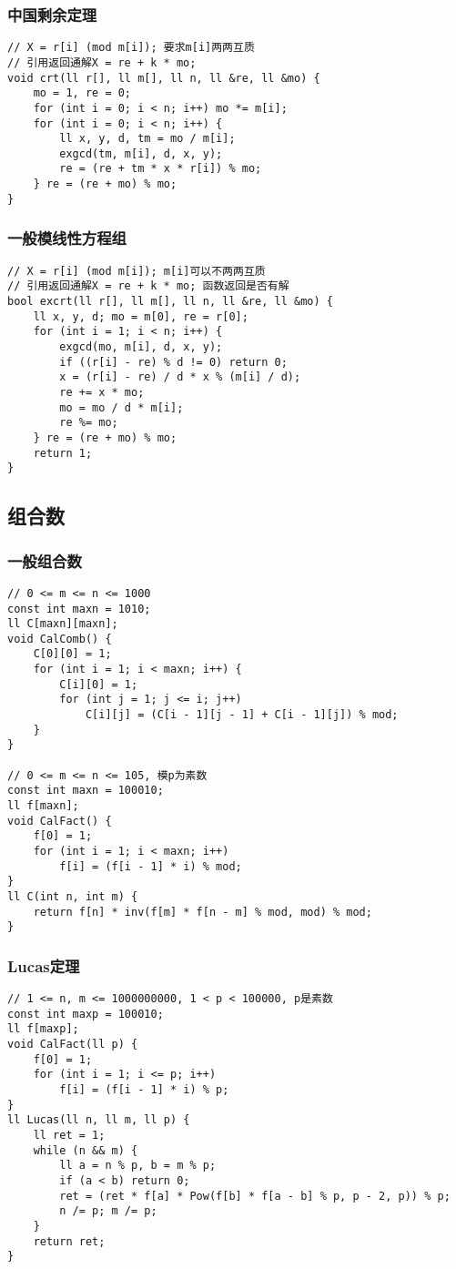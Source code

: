 \documentclass[a4paper]{article}
\begin{document}
\subsubsection{中国剩余定理}
\begin{lstlisting}
// X = r[i] (mod m[i]); 要求m[i]两两互质
// 引用返回通解X = re + k * mo;
void crt(ll r[], ll m[], ll n, ll &re, ll &mo) {
	mo = 1, re = 0;
	for (int i = 0; i < n; i++) mo *= m[i];
	for (int i = 0; i < n; i++) {
		ll x, y, d, tm = mo / m[i];
		exgcd(tm, m[i], d, x, y);
		re = (re + tm * x * r[i]) % mo;
	} re = (re + mo) % mo;
}
\end{lstlisting}
\subsubsection{一般模线性方程组}
\begin{lstlisting}
// X = r[i] (mod m[i]); m[i]可以不两两互质
// 引用返回通解X = re + k * mo; 函数返回是否有解
bool excrt(ll r[], ll m[], ll n, ll &re, ll &mo) {
	ll x, y, d; mo = m[0], re = r[0];
	for (int i = 1; i < n; i++) {
		exgcd(mo, m[i], d, x, y);
		if ((r[i] - re) % d != 0) return 0;
		x = (r[i] - re) / d * x % (m[i] / d);
		re += x * mo;
		mo = mo / d * m[i];
		re %= mo;
	} re = (re + mo) % mo;
	return 1;
}
\end{lstlisting}
\subsection{组合数}
\subsubsection{一般组合数}
\begin{lstlisting}
// 0 <= m <= n <= 1000
const int maxn = 1010;
ll C[maxn][maxn];
void CalComb() {
	C[0][0] = 1;
	for (int i = 1; i < maxn; i++) {
		C[i][0] = 1;
		for (int j = 1; j <= i; j++)
			C[i][j] = (C[i - 1][j - 1] + C[i - 1][j]) % mod;
	}
}

// 0 <= m <= n <= 105, 模p为素数
const int maxn = 100010;
ll f[maxn];
void CalFact() {
	f[0] = 1;
	for (int i = 1; i < maxn; i++)
		f[i] = (f[i - 1] * i) % mod;
}
ll C(int n, int m) {
	return f[n] * inv(f[m] * f[n - m] % mod, mod) % mod;
}
\end{lstlisting}
\subsubsection{Lucas定理}
\begin{lstlisting}
// 1 <= n, m <= 1000000000, 1 < p < 100000, p是素数
const int maxp = 100010;
ll f[maxp];
void CalFact(ll p) {
	f[0] = 1;
	for (int i = 1; i <= p; i++)
		f[i] = (f[i - 1] * i) % p;
}
ll Lucas(ll n, ll m, ll p) {
	ll ret = 1;
	while (n && m) {
		ll a = n % p, b = m % p;
		if (a < b) return 0;
		ret = (ret * f[a] * Pow(f[b] * f[a - b] % p, p - 2, p)) % p;
		n /= p; m /= p;
	}
	return ret;
}
\end{lstlisting}
\end{document}
